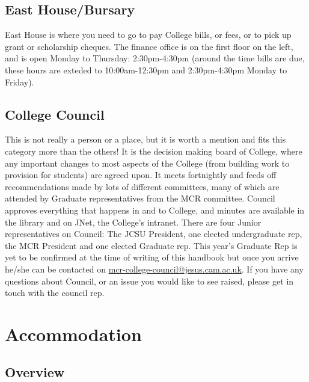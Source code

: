\documentclass[11pt,fleqn, oneside]{book} %
\begin{document}
\subsection{East House/Bursary}

East House is where you need to go to pay College bills, or fees, or to pick up grant or scholarship cheques.  The finance office is on the first floor on the left, and is open Monday to Thursday: 2:30pm-4:30pm (around the time bills are due, these hours are exteded to 10:00am-12:30pm and 2:30pm-4:30pm Monday to Friday).

\subsection{College Council}

This is not really a person or a place, but it is worth a mention and fits this category more than the others!  It is the decision making board of College, where any important changes to most aspects of the College (from building work to provision for students) are agreed upon. It meets fortnightly and feeds off recommendations made by lots of different committees, many of which are attended by Graduate representatives from the MCR committee. Council approves everything that happens in and to College, and minutes are available in the library and on JNet, the College’s intranet. There are four Junior representatives on Council: The JCSU President, one elected undergraduate rep, the MCR President and one elected Graduate rep.  This year’s Graduate Rep is yet to be confirmed at the time of writing of this handbook but once you arrive he/she can be contacted on \url{mcr-college-council@jesus.cam.ac.uk}. If you have any questions about Council, or an issue you would like to see raised, please get in touch with the council rep. 

\section{Accommodation}

\subsection{Overview}
\end{document}
